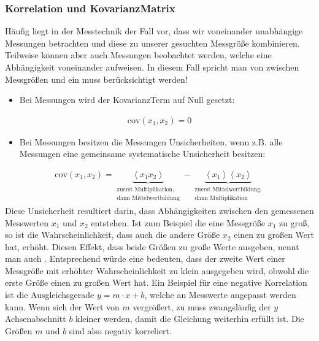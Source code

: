 \documentclass[letterpaper,10pt,english]{jupyterBook}
\begin{document}
\subsubsection{Korrelation und Kovarianz\sphinxhyphen{}Matrix}
\label{\detokenize{content/1_Fehlerfortpflanzung:korrelation-und-kovarianz-matrix}}
\sphinxAtStartPar
Häufig liegt in der Messtechnik der Fall vor, dass wir voneinander unabhängige Messungen betrachten und diese zu unserer gesuchten Messgröße kombinieren. Teilweise können aber auch Messungen beobachtet werden, welche eine Abhängigkeit voneinander aufweisen. In diesem Fall spricht man von  zwischen Messgrößen und ein  muss berücksichtigt werden!
\begin{itemize}
\item {} 
\sphinxAtStartPar
Bei  Messungen wird der Kovarianz\sphinxhyphen{}Term auf Null gesetzt:

\end{itemize}
\begin{equation*}
\begin{split}\mathrm{cov}(x_1, x_2) = 0\end{split}
\end{equation*}\begin{itemize}
\item {} 
\sphinxAtStartPar
Bei  Messungen besitzen die Messungen  Unsicherheiten, wenn z.B. alle Messungen eine gemeinsame systematische Unsicherheit besitzen:

\end{itemize}
\begin{equation*}
\begin{split}\mathrm{cov}(x_1, x_2) = \underbrace{\left< x_1 x_2 \right>}_{\substack{\text{zuerst Multiplikation,} \\ \text{dann Mittelwertbildung}}} - \underbrace{\left< x_1 \right>\left< x_2 \right>}_{\substack{\text{zuerst Mittelwertbildung,} \\ \text{dann Multiplikation}}}\end{split}
\end{equation*}
\sphinxAtStartPar
Diese  Unsicherheit resultiert darin, dass Abhängigkeiten zwischen den gemessenen Messwerten \(x_1\) und \(x_2\) entstehen. Ist zum Beispiel die eine Messgröße \(x_1\) zu groß, so ist die Wahrscheinlichkeit, dass auch die andere Größe \(x_2\) einen zu großen Wert hat, erhöht. Diesen Effekt, dass beide Größen zu große Werte ausgeben, nennt man auch . Entsprechend würde eine  bedeuten, dass der zweite Wert einer Messgröße mit erhöhter Wahrscheinlichkeit zu klein ausgegeben wird, obwohl die erste Größe einen zu großen Wert hat. Ein Beispiel für eine negative Korrelation ist die Ausgleichsgerade \(y = m\cdot x + b\), welche an Messwerte angepasst werden kann. Wenn sich der Wert von \(m\) vergrößert, zu muss zwangsläufig der \(y\)\sphinxhyphen{}Achsenabschnitt \(b\) kleiner werden, damit die Gleichung weiterhin erfüllt ist. Die Größen \(m\) und \(b\) sind also negativ korreliert.
\end{document}
